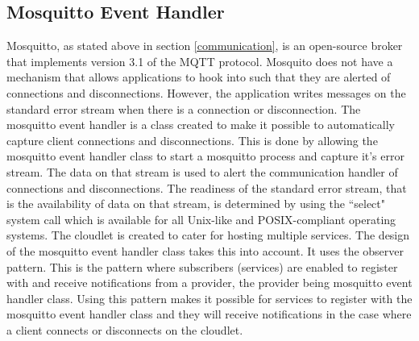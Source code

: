 \subsection{Mosquitto Event Handler}
Mosquitto, as stated above in section \ref{communication}, is an open-source broker that implements version 3.1 of the MQTT protocol. Mosquito does not have a mechanism that allows applications to hook into such that they are alerted of connections and disconnections. However, the application writes messages on the standard error stream when there is a connection or disconnection. The mosquitto event handler is a class created to make it possible to automatically capture client connections and disconnections. This is done by allowing the mosquitto event handler class to start a mosquitto process and capture it's error stream. The data on that stream is used to alert the communication handler of connections and disconnections. The readiness of the standard error stream, that is the availability of data on that stream, is determined by using the ``select" system call which is available for all Unix-like and POSIX-compliant operating systems. The cloudlet is created to cater for hosting multiple services. The design of the mosquitto event handler class takes this into account. It uses the observer pattern. This is the pattern where subscribers (services) are enabled to register with and receive notifications from a provider, the provider being mosquitto event handler class. Using this pattern makes it possible for services to register with the  mosquitto event handler class and they will receive notifications in the case where a client connects or disconnects on the cloudlet.


